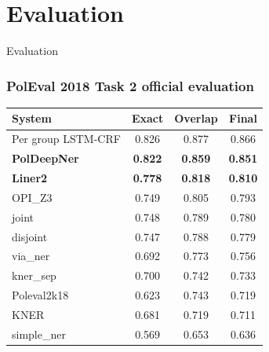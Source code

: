 \documentclass[Warsaw]{beamer}
\begin{document}
\section{Evaluation}

\begin{frame}
    \begin{center}
        \Huge
        Evaluation
    \end{center}
\end{frame}

\begin{frame}
    \frametitle{PolEval 2018 Task 2 official evaluation}
\begin{table}[ht]
    \scriptsize
    \centering
    \bgroup
    \def\arraystretch{1.3}%
    \begin{tabular}{l|c|c|c}
        \textbf{System}	
        & \hspace{0.2em} \textbf{Exact} \hspace{0.2em} 
        & \hspace{0.2em} \textbf{Overlap} \hspace{0.2em} 
        & \hspace{0.2em} \textbf{Final} \hspace{0.2em}\\
        \hline
        \hline
        Per group LSTM-CRF 	& 0.826	 & 0.877 & 0.866 \\
        \textbf{PolDeepNer}	& \textbf{0.822} & \textbf{0.859} &	\textbf{0.851} \\
        \textbf{Liner2}	    & \textbf{0.778} & \textbf{0.818} & \textbf{0.810} \\
        OPI\_Z3              & 0.749 & 0.805 & 0.793 \\
        joint	            & 0.748	& 0.789	& 0.780 \\
        disjoint	        & 0.747	& 0.788	& 0.779 \\
        via\_ner	        & 0.692	& 0.773	& 0.756 \\
        kner\_sep	        & 0.700	& 0.742	& 0.733 \\
        Poleval2k18	        & 0.623	& 0.743	& 0.719 \\
        KNER	 	        & 0.681	& 0.719	& 0.711 \\
        simple\_ner	        & 0.569	& 0.653	& 0.636 \\
    \end{tabular}
    \label{tab:poleval-task2-results}
\end{table}    
\end{frame}
\end{document}
